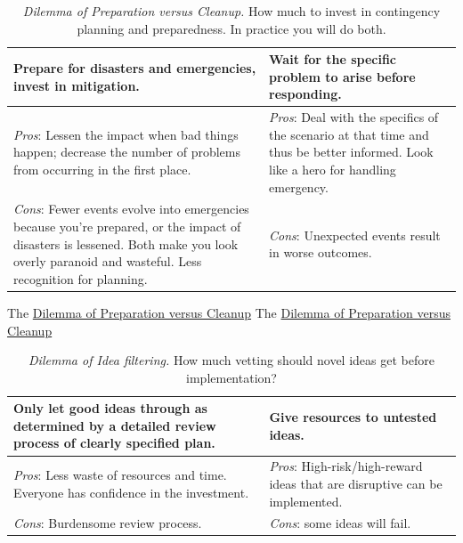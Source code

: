 \begin{center}
\begin{table}[H] %
\begin{tabular}{ | m{\dilemmatablewidth}| m{\dilemmatablewidth} | } 
  \hline
  \textbf{Prepare for disasters and emergencies, invest in mitigation.} &
  \textbf{Wait for the specific problem to arise before responding.} \\
  \hline
  \textit{Pros}: Lessen the impact when bad things happen; decrease the number of problems from occurring in the first place. &
  \textit{Pros}: Deal with the specifics of the scenario at that time and thus be better informed. Look like a hero for handling emergency. \\
  \hline
  \textit{Cons}: Fewer events evolve into emergencies because you're prepared, or the impact of disasters is lessened. Both make you look overly paranoid and wasteful. Less recognition for planning. & 
  \textit{Cons}: Unexpected events result in worse outcomes.  \\
  \hline
\end{tabular}
\caption{
\textit{Dilemma of Preparation versus Cleanup.} 
How much to invest in contingency planning and preparedness. In practice you will do both.}
\label{table:emergencies-vs-ignore}
\end{table}
\end{center}

The \href{table:emergencies-vs-ignore}{Dilemma of Preparation versus Cleanup}
The \href{table:emergencies-vs-ignore}{Dilemma of Preparation versus Cleanup}


\begin{center}
\begin{table}[H] %
\begin{tabular}{ | m{\dilemmatablewidth}| m{\dilemmatablewidth} | } 
  \hline
  \textbf{Only let good ideas through as determined by a detailed review process of clearly specified plan.} &
  \textbf{Give resources to untested ideas.} \\
  \hline
  \textit{Pros}: Less waste of resources and time. Everyone has confidence in the investment. & 
  \textit{Pros}: High-risk/high-reward ideas that are disruptive can be implemented. \\
  \hline
  \textit{Cons}: Burdensome review process. & 
  \textit{Cons}: some ideas will fail. \\
  \hline
\end{tabular}
\caption{
\textit{Dilemma of Idea filtering.}
How much vetting should novel ideas get before implementation?
}
\label{table:idea-filtering}
\end{table}
\end{center}

